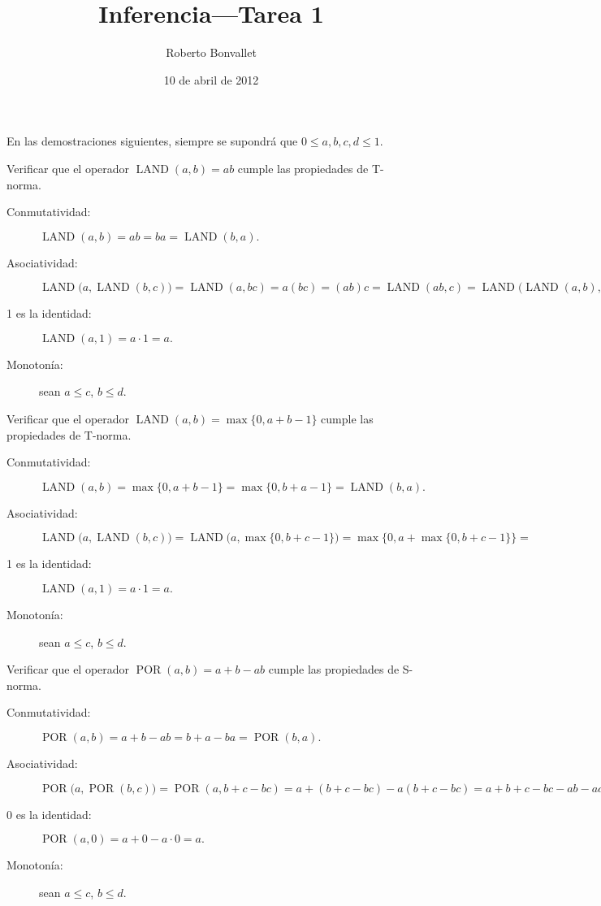 \documentclass{article}
\title{Inferencia---Tarea 1}
\author{Roberto Bonvallet}
\date{10 de abril de 2012}
\DeclareMathOperator{\LAND}{LAND}
\DeclareMathOperator{\PAND}{LAND}
\DeclareMathOperator{\POR} {POR}
\begin{document}
\maketitle

En las demostraciones siguientes,
siempre se supondrá que
\(0\le a, b, c, d\le 1\).

Verificar que el operador \(\PAND(a, b) = ab\)
cumple las propiedades de T-norma.
%
\begin{description}
  \item[Conmutatividad:]
    \(
      \PAND(a, b) =
      ab =
      ba =
      \PAND(b, a).
    \)
  \item[Asociatividad:]
    \(
      \PAND\bigl(a, \PAND(b, c)\bigr) =
      \PAND(a, bc) =
      a(bc) =
      (ab)c =
      \PAND(ab, c) =
      \PAND\bigl(\PAND(a, b), c\bigr).
    \)
  \item[1 es la identidad:]
    \(
      \PAND(a, 1) = a\cdot 1 = a.
    \)
  \item[Monotonía:] sean \(a\le c\), \(b\le d\).

\end{description}

Verificar que el operador \(\LAND(a, b) = \max\{0, a + b - 1\}\)
cumple las propiedades de T-norma.
%
\begin{description}
  \item[Conmutatividad:]
    \(
      \LAND(a, b) =
      \max\{0, a + b - 1\} =
      \max\{0, b + a - 1\} =
      \LAND(b, a).
    \)
  \item[Asociatividad:]
    \(
      \LAND\bigl(a, \LAND(b, c)\bigr) =
      \LAND\bigl(a, \max\{0, b + c - 1\}\bigr) =
      \max\bigl\{0, a + \max\{0, b + c - 1\}\bigl\} =
    \)
  \item[1 es la identidad:]
    \(
      \PAND(a, 1) = a\cdot 1 = a.
    \)
  \item[Monotonía:] sean \(a\le c\), \(b\le d\).

\end{description}

Verificar que el operador \(\POR(a, b) = a + b - ab\)
cumple las propiedades de S-norma.
%
\begin{description}
  \item[Conmutatividad:]
    \(
      \POR(a, b) =
      a + b - ab =
      b + a - ba =
      \POR(b, a).
    \)
  \item[Asociatividad:]
    \(
      \POR\bigl(a, \POR(b, c)\bigr) =
      \POR(a, b + c - bc) =
      a + (b + c - bc) - a(b + c - bc) =
      a + b + c - bc - ab - ac - abc =
      (a + b - ab) + c - (a + b - ab)c =
      \POR(a + b - ab, c) =
      \POR\bigl(\POR(a, b), c\bigr).
    \)
  \item[0 es la identidad:]
    \(
      \POR(a, 0) = a + 0 - a\cdot 0 = a.
    \)
  \item[Monotonía:] sean \(a\le c\), \(b\le d\).
\end{description}
\end{document}
